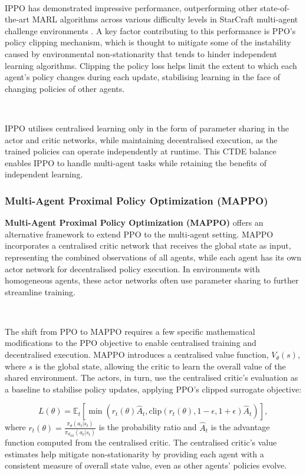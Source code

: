 \documentclass{article}
\begin{document}
\

IPPO has demonstrated impressive performance, outperforming other state-of-the-art MARL algorithms across various difficulty levels in StarCraft multi-agent challenge environments \citep{witt2020independent}. A key factor contributing to this performance is PPO’s policy clipping mechanism, which is thought to mitigate some of the instability caused by environmental non-stationarity that tends to hinder independent learning algorithms. Clipping the policy loss helps limit the extent to which each agent’s policy changes during each update, stabilising learning in the face of changing policies of other agents.

\

IPPO utilises centralised learning only in the form of parameter sharing in the actor and critic networks, while maintaining decentralised execution, as the trained policies can operate independently at runtime. This CTDE balance enables IPPO to handle multi-agent tasks while retaining the benefits of independent learning.

\subsubsection{Multi-Agent Proximal Policy Optimization (MAPPO)}

\textbf{Multi-Agent Proximal Policy Optimization (MAPPO)}\citep{chao2021surprising} offers an alternative framework to extend PPO to the multi-agent setting. MAPPO incorporates a centralised critic network that receives the global state as input, representing the combined observations of all agents, while each agent has its own actor network for decentralised policy execution. In environments with homogeneous agents, these actor networks often use parameter sharing to further streamline training. 

\

The shift from PPO to MAPPO requires a few specific mathematical modifications to the PPO objective to enable centralised training and decentralised execution. MAPPO introduces a centralised value function, \( V_{\theta}(s) \), where \(s\) is the global state, allowing the critic to learn the overall value of the shared environment. The actors, in turn, use the centralised critic’s evaluation as a baseline to stabilise policy updates, applying PPO’s clipped surrogate objective:

\begin{equation}
L(\theta) = \mathbb{E}_t \left[ \min \left( r_t(\theta) \hat{A}_t, \text{clip}(r_t(\theta), 1 - \epsilon, 1 + \epsilon) \hat{A}_t \right) \right],
\end{equation}
where \( r_t(\theta) = \frac{\pi_{\theta}(a_t | s_t)}{\pi_{\theta_\text{old}}(a_t | s_t)} \) is the probability ratio and \( \hat{A}_t \) is the advantage function computed from the centralised critic. The centralised critic’s value estimates help mitigate non-stationarity by providing each agent with a consistent measure of overall state value, even as other agents’ policies evolve.
\end{document}

